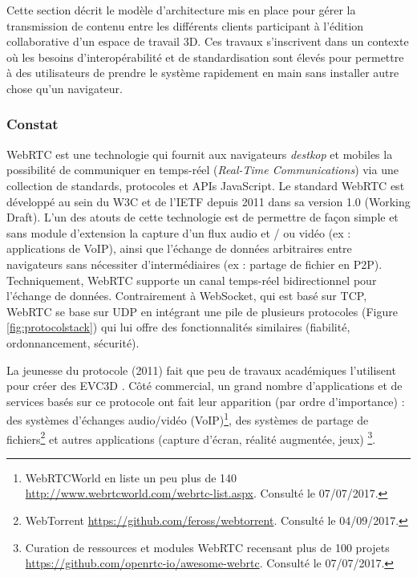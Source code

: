 Cette section décrit le modèle d'architecture mis en 
place pour gérer la transmission de contenu entre les différents clients 
participant à l'édition collaborative d'un espace de travail 3D. 
Ces travaux s'inscrivent dans un contexte où les besoins d'interopérabilité 
et de standardisation sont élevés pour permettre à des utilisateurs de 
prendre le système rapidement en main sans installer autre chose qu'un 
navigateur. 

\subsubsection{Constat}

\gls{WebRTC} est une technologie qui fournit aux navigateurs 
\textit{destkop} et mobiles la possibilité de communiquer en temps-réel 
(\textit{Real-Time Communications}) via une collection de standards, 
protocoles et \glspl{API} JavaScript. 
Le standard \gls{WebRTC} est développé au sein du \gls{W3C} et de 
l'\gls{IETF} depuis 2011 dans sa version 1.0 (Working Draft). 
L'un des atouts de cette technologie est de permettre de façon simple et 
sans module d'extension la capture d'un flux audio et / ou vidéo (ex : 
applications de VoIP), ainsi que l'échange de données arbitraires entre 
navigateurs sans nécessiter d'intermédiaires (ex : partage de fichier en 
P2P).
Techniquement, \gls{WebRTC} supporte un canal temps-réel 
bidirectionnel pour l'échange de données. Contrairement à 
\gls{WebSocket}, qui est basé sur \gls{TCP}, \gls{WebRTC} se base sur 
\acrshort{UDP} en intégrant une pile de plusieurs protocoles (Figure 
\ref{fig:protocolstack}) qui lui offre des fonctionnalités similaires (fiabilité, 
ordonnancement, sécurité). 

La jeunesse du protocole (2011) fait que peu de travaux académiques 
l'utilisent pour créer des \gls{EVC3D} \cite{Desprat2015a,Steiakaki2016}. 
Côté commercial, un grand nombre d'applications et de services 
basés sur ce protocole ont fait leur apparition (par ordre d'importance) : 
des systèmes d'échanges audio/vidéo (VoIP)\footnote{WebRTCWorld en 
	liste un peu plus de 140 
	\url{http://www.webrtcworld.com/webrtc-list.aspx}. Consulté le 
	07/07/2017.}, des systèmes de partage de fichiers\footnote{WebTorrent 
	\url{https://github.com/feross/webtorrent}. Consulté le 04/09/2017.} et 
autres applications (capture d'écran, réalité augmentée, jeux)
\footnote{Curation de ressources et modules WebRTC 
	recensant plus de 100 projets 
	\url{https://github.com/openrtc-io/awesome-webrtc}. Consulté le 
	07/07/2017.}. 

